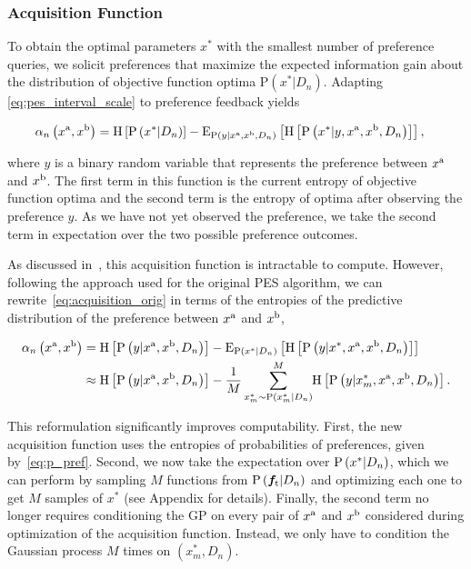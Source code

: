 \subsubsection{Acquisition Function}
To obtain the optimal parameters $x^*$ with the smallest number of preference
queries, we solicit preferences that maximize the expected information gain
about the distribution of objective function optima $\mathrm{P}(x^*|D_n)$.
Adapting \cref{eq:pes_interval_scale} to preference feedback yields
\begin{fullwidth}
\begin{align}
    &\alpha_n \left(x^\tn{a}, x^\tn{b}\right) 
        = \funcsb{H}{\prob{x^*|D_n}} - \funcsb{E}[\prob{y|x^\tn{a},x^\tn{b},D_n}]
            {\funcsb{H}{\prob{x^*|y, x^\tn{a}, x^\tn{b}, D_n}}},
    \label{eq:acquisition_orig}
\end{align}
\end{fullwidth}
where $y$ is a binary random variable that represents the preference between
$x^{\mathrm{a}}$ and $x^{\mathrm{b}}$. The first term in this function is the current
entropy of objective function optima and the second term is the entropy of
optima after observing the preference $y$. As we have not yet observed the
preference, we take the second term in expectation over the two possible
preference outcomes.

As discussed in~\citep{hernandez2014predictive}, this acquisition function is
intractable to compute. However, following the approach used for the original
PES algorithm, we can rewrite~\cref{eq:acquisition_orig} in terms of the
entropies of the predictive distribution of the preference between $x^{\mathrm{a}}$
and $x^{\mathrm{b}}$,
\begin{fullwidth}
\begin{align}
    \alpha_n \left(x^\tn{a}, x^\tn{b} \right) &= 
        \funcsb{H}{\prob{y|x^\tn{a}, x^\tn{b}, D_n}}
            - \funcsb{E}[\prob{x^*|D_n}]{\funcsb{H}
            {\prob{y| x^*, x^\tn{a}, x^\tn{b}, D_n}}} \\
        &\approx \funcsb{H}{\prob{y|x^\tn{a}, x^\tn{b}, D_n}}
            - \frac{1}{M} \sum_{x_m^* \sim {\prob{x_m^*|D_n}}}^M 
            \hspace{-0.03in}\funcsb{H}{\prob{y| x_m^*, x^\tn{a},x^\tn{b},D_n}}.
        \label{eq:aq_approx}
\end{align}
\end{fullwidth}
This reformulation significantly improves computability. First, the new
acquisition function uses the entropies of probabilities of preferences, given
by~\cref{eq:p_pref}. Second, we now take the expectation over $\operatorname{P} \left( x^*|D_n \right)$,
which we can perform by sampling $M$ functions from
$\prob{\vecf{f}[\tn{t}]|D_n}$ and optimizing each one to get $M$ samples of
$x^*$ (see Appendix for details). Finally, the second term no longer requires
conditioning the GP on every pair of $x^{\mathrm{a}}$ and $x^{\mathrm{b}}$ considered during
optimization of the acquisition function.  Instead, we only have to condition
the Gaussian process $M$ times on $(x_m^*, D_n)$.

